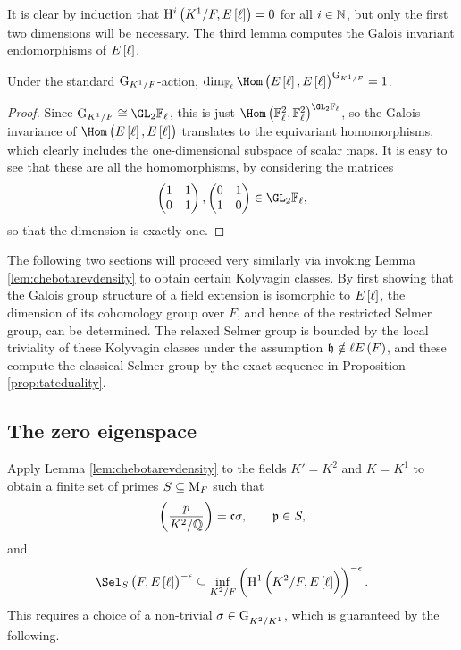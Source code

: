 It is clear by induction that $ \H^i\br{K^1 / F, E\sbr{\ell}} = 0 $ for all $ i \in \mathbb{N} $, but only the first two dimensions will be necessary. The third lemma computes the Galois invariant endomorphisms of $ E\sbr{\ell} $.

\begin{lemma}
\label{lem:invariantendomorphisms}
Under the standard $ \mathrm{G}_{K^1 / F} $-action, $ \dim_{\FF_\ell} \Hom\br{E\sbr{\ell}, E\sbr{\ell}}^{\G_{K^1 / F}} = 1 $.
\end{lemma}

\begin{proof}
Since $ \G_{K^1 / F} \cong \GL_2 \FF_\ell $, this is just $ \Hom\br{\FF_\ell^2, \FF_\ell^2}^{\GL_2 \FF_\ell} $, so the Galois invariance of $ \Hom\br{E\sbr{\ell}, E\sbr{\ell}} $ translates to the equivariant homomorphisms, which clearly includes the one-dimensional subspace of scalar maps. It is easy to see that these are all the homomorphisms, by considering the matrices
$$ \twobytwo{1}{1}{0}{1}, \twobytwo{0}{1}{1}{0} \in \GL_2 \FF_\ell, $$
so that the dimension is exactly one.
\end{proof}

The following two sections will proceed very similarly via invoking Lemma \ref{lem:chebotarevdensity} to obtain certain Kolyvagin classes. By first showing that the Galois group structure of a field extension is isomorphic to $ E\sbr{\ell} $, the dimension of its cohomology group over $ F $, and hence of the restricted Selmer group, can be determined. The relaxed Selmer group is bounded by the local triviality of these Kolyvagin classes under the assumption $ \hhh \notin \ell E\br{F} $, and these compute the classical Selmer group by the exact sequence in Proposition \ref{prop:tateduality}.

\pagebreak

\subsection{The zero eigenspace}

Apply Lemma \ref{lem:chebotarevdensity} to the fields $ K' = K^2 $ and $ K = K^1 $ to obtain a finite set of primes $ S \subseteq \mathrm{M}_F $ such that
$$ \br{\dfrac{p}{K^2 / \QQ}} = \ccc\sigma, \qquad \ppp \in S, $$
and
$$ \Sel_S\br{F, E\sbr{\ell}}^{-\epsilon} \subseteq \inf_{K^2 / F}\br{\H^1\br{K^2 / F, E\sbr{\ell}}}^{-\epsilon}. $$
This requires a choice of a non-trivial $ \sigma \in \mathrm{G}_{K^2 / K^1}^- $, which is guaranteed by the following.

